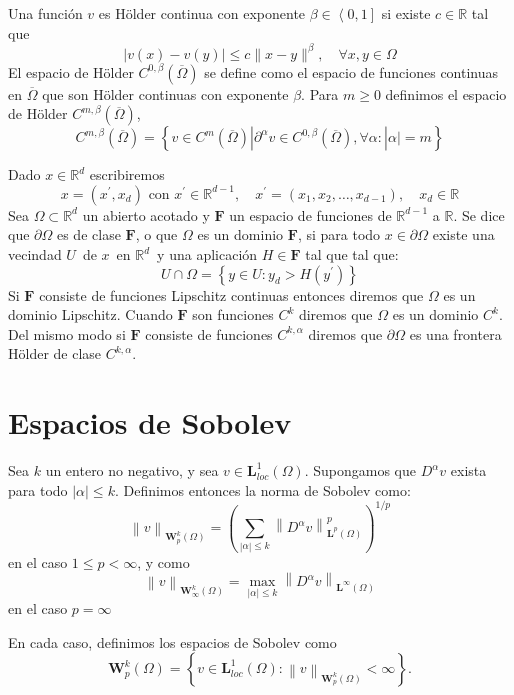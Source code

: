 Una función $v$ es H\"{o}lder continua con exponente $\beta\in \left<0,1 \right]$ si existe $c\in\mathbb{R}$ tal que
\[
|v(x)-v(y)|\leqslant c\|x-y\|^\beta,\quad  \forall x,y\in\Omega
\]
El espacio de  H\"{o}lder $C^{0,\beta}(\overline{\Omega})$ se define como el espacio de funciones continuas en $\overline{\Omega}$ que son H\"{o}lder continuas con exponente $\beta$. Para $m\geq 0$ definimos el espacio de H\"{o}lder $C^{m,\beta}(\overline{\Omega})$,
\[
C^{m,\beta}(\overline{\Omega}) = \left\{
v\in C^m(\overline{\Omega}) | \partial^\alpha v\in C^{0,\beta}(\overline{\Omega}),\forall \alpha:|\alpha|=m
\right\}
\]
\begin{defi}
	Dado $x\in \mathbb{R}^{d}$ escribiremos
	\[
	x=\left( x^{\prime },x_{d}\right) \text{ con }x^{\prime }\in \mathbb{R}%
	^{d-1},\quad x^{\prime }=\left( x_{1},x_{2},\ldots,x_{d-1}\right)
	,\quad x_d\in\mathbb{R}
	\]
	Sea $\Omega \subset \mathbb{R}^{d}$ un abierto acotado y $\mathit{\mathbf{F}}$ un espacio
	de funciones de $\mathbb{R}^{d-1}$ a $\mathbb{R}$. Se dice que $\partial \Omega $ es de clase $%
	\mathit{\mathbf{F}}$, o que $\Omega $ es un dominio $\mathit{\mathbf{F}}$,
	si para todo $x\in \partial \Omega $ existe una vecindad $U$\ de $x$\ en $%
	\mathbb{R}^{d}$\ y una aplicación $H\in \mathbf{F}$ tal que tal que:
	\[
	U\cap \Omega =\left\{ y\in U:y_{d}>H\left( y^{\prime }\right) \right\}
	\]
	Si $\mathbf{F}$  consiste de funciones Lipschitz continuas entonces diremos que $\Omega$ es un dominio Lipschitz. Cuando $\mathbf{F}$ son funciones $C^k$ diremos que $\Omega$ es un dominio $C^k$. Del mismo modo si $\mathbf{F}$ consiste de funciones $C^{k,\alpha}$ diremos que $\partial\Omega$ es una frontera H\"{o}lder de clase $C^{k,\alpha}$.
\end{defi}
\section{Espacios de Sobolev}
\begin{defi}
	Sea $k$ un entero no negativo, y sea $v\in \mathbf{L}_{loc}^{1}(\Omega )
	$. Supongamos que $D^{\alpha }v$ exista para todo $\left| \alpha \right|
	\mathbf{\leqslant }k$. Definimos entonces la norma de Sobolev como:
	\[
	\left\| v\right\| _{\mathbf{W}_{p}^{k}(\Omega )}=\left( \sum_{\left|
		\alpha \right| \mathbf{\leqslant }k}\left\| D^{\alpha }v\right\| _{\mathbf{L}%
		^{p}(\Omega )}^{p}\right) ^{1/p}
	\]
	en el caso $1\leqslant p<\infty$, y como
	\[
	\left\| v\right\| _{\mathbf{W}_{\infty }^{k}(\Omega )}=\max\limits_{\left|
		\alpha \right| \mathbf{\leqslant }k}\left\| D^{\alpha }v\right\| _{\mathbf{L}%
		^{\infty }(\Omega )}
	\]
	en el caso $p=\infty $
	
	En cada caso, definimos los espacios de Sobolev como
	\[
	\mathbf{W}_{p}^{k}(\Omega )=\left\{ v\in \mathbf{L}_{loc}^{1}(\Omega
	):\left\| v\right\| _{\mathbf{W}_{p}^{k}(\Omega )}<\infty \right\} .
	\]
\end{defi}

